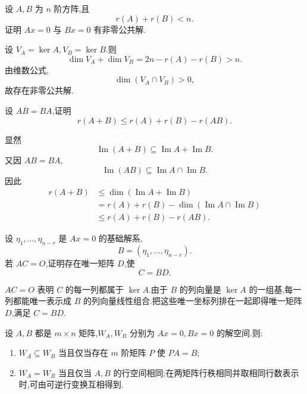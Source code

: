 \begin{example}
设 $A,B$ 为 $n$ 阶方阵,且
\[
r(A)+r(B)<n.
\]
证明 $Ax=0$ 与 $Bx=0$ 有非零公共解.
\end{example}
\exampleblank

\begin{solution}
设 $V_A=\ker A,V_B=\ker B$.则
\[
\dim V_A+\dim V_B
=2n-r(A)-r(B)>n.
\]
由维数公式,
\[
\dim(V_A\cap V_B)>0,
\]
故存在非零公共解.
\end{solution}

\begin{example}
设 $AB=BA$,证明
\[
r(A+B)\leq r(A)+r(B)-r(AB).
\]
\end{example}
\exampleblank

\begin{solution}
显然
\[
\operatorname{Im}(A+B)\subseteq\operatorname{Im}A+\operatorname{Im}B.
\]
又因 $AB=BA$,
\[
\operatorname{Im}(AB)\subseteq\operatorname{Im}A\cap\operatorname{Im}B.
\]
因此
\[
\begin{aligned}
r(A+B)
&\leq\dim(\operatorname{Im}A+\operatorname{Im}B)\\
&=r(A)+r(B)-\dim(\operatorname{Im}A\cap\operatorname{Im}B)\\
&\leq r(A)+r(B)-r(AB).
\end{aligned}
\]
\end{solution}

\begin{example}
设 $\eta_1,\ldots,\eta_{n-r}$ 是 $Ax=0$ 的基础解系,
\[
B=(\eta_1,\ldots,\eta_{n-r}).
\]
若 $AC=O$,证明存在唯一矩阵 $D$,使
\[
C=BD.
\]
\end{example}
\exampleblank

\begin{solution}
$AC=O$ 表明 $C$ 的每一列都属于 $\ker A$.由于 $B$ 的列向量是 $\ker A$ 的一组基,每一列都能唯一表示成 $B$ 的列向量线性组合.把这些唯一坐标列排在一起即得唯一矩阵 $D$,满足 $C=BD$.
\end{solution}

\begin{proposition}[\markstar]
设 $A,B$ 都是 $m\times n$ 矩阵,$W_A,W_B$ 分别为 $Ax=0,Bx=0$ 的解空间.则:
\begin{enumerate}
  \item $W_A\subseteq W_B$ 当且仅当存在 $m$ 阶矩阵 $P$ 使 $PA=B$;
  \item $W_A=W_B$ 当且仅当 $A,B$ 的行空间相同;在两矩阵行秩相同并取相同行数表示时,可由可逆行变换互相得到.
\end{enumerate}
\end{proposition}

